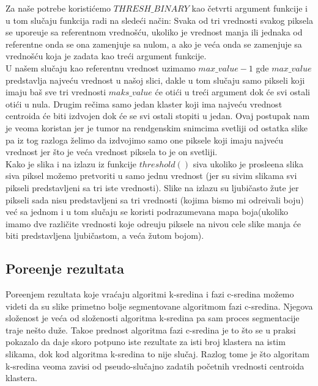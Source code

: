 \documentclass{article}
\begin{document}
Za na\v{s}e potrebe koristi\'{c}emo $THRESH\_BINARY$ kao \v{c}etvrti argument funkcije i u tom slu\v{c}aju funkcija radi na slede\'{c}i na\v{c}in: Svaka od tri vrednosti svakog piksela se upore\dj uje sa referentnom vredno\v{s}\'{c}u, ukoliko je vrednost manja ili jednaka od referentne onda se ona zamenjuje sa nulom, a ako je ve\'{c}a onda se zamenjuje sa vredno\v{s}\'{c}u koja je zadata kao tre\'{c}i argument funkcije.\\

U na\v{s}em slu\v{c}aju kao referentnu vrednost uzimamo $ max\_value - 1 $ gde $ max\_value $ predstavlja najve\'{c}u vrednost u na\v{s}oj slici, dakle u tom slu\v{c}aju samo pikseli koji imaju ba\v{s} sve tri vrednosti $ maks\_value $ \'{c}e oti\'{c}i u tre\'{c}i argument dok \'{c}e svi ostali oti\'{c}i u nula. Drugim re\v{c}ima samo jedan klaster koji ima najve\'{c}u vrednost centroida \'{c}e biti izdvojen dok \'{c}e se svi ostali stopiti u jedan. Ovaj postupak nam je veoma koristan jer je tumor na rendgenskim snimcima svetliji od ostatka slike pa iz tog razloga \v{z}elimo da izdvojimo samo one piksele koji imaju najve\'{c}u vrednost jer \v{s}to je ve\'{c}a vrednost piksela to je on svetliji.\\

Kako je slika i na izlazu iz funkcije $ threshold() $ siva ukoliko je prosle\dj ena slika siva piksel mo\v{z}emo pretvoriti u samo jednu vrednost (jer su sivim slikama svi pikseli predstavljeni sa tri iste vrednosti). Slike na izlazu su ljubi\v{c}asto \v{z}ute jer pikseli sada nisu predstavljeni sa tri vrednosti (kojima bismo mi odre\dj ivali boju) ve\'{c} sa jednom i u tom slu\v{c}aju se koristi podrazumevana mapa boja(ukoliko imamo dve razli\v{c}ite vrednosti koje odre\dj uju piksele na nivou cele slike manja \'{c}e biti predstavljena ljubi\v{c}astom, a ve\'{c}a \v{z}utom bojom).


\subsection{\selectfont Pore\dj enje rezultata}

Pore\dj enjem rezultata koje vra\'{c}aju algoritmi k-sredina i fazi c-sredina mo\v{z}emo videti da su slike primetno bolje segmentovane algoritmom fazi c-sredina. Njegova slo\v{z}enost je ve\'{c}a od slo\v{z}enosti algoritma k-sredina pa sam proces segmentacije traje ne\v{s}to du\v{z}e. Tako\dj e prednost algoritma fazi c-sredina je to \v{s}to se u praksi pokazalo da daje skoro potpuno iste rezultate za isti broj klastera na istim slikama, dok kod algoritma k-sredina to nije slu\v{c}aj. Razlog tome je \v{s}to algoritam k-sredina veoma zavisi od pseudo-slu\v{c}ajno zadatih po\v{c}etnih vrednosti centroida klastera.
\end{document}

